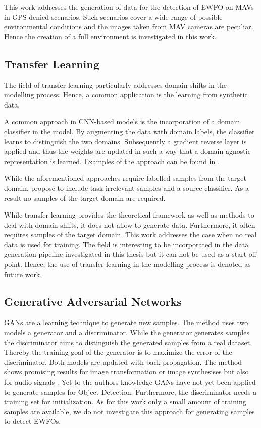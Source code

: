 This work addresses the generation of data for the detection of \ac{EWFO} on \acp{MAV} in \ac{GPS} denied scenarios. Such scenarios cover a wide range of possible environmental conditions and the images taken from \ac{MAV} cameras are peculiar. Hence the creation of a full environment is investigated in this work. 


\subsection{Transfer Learning}

The field of transfer learning particularly addresses domain shifts in the modelling process. Hence, a common application is the learning from synthetic data.

A common approach in \ac{CNN}-based models is the incorporation of a domain classifier in the model. By augmenting the data with domain labels, the classifier learns to distinguish the two domains. Subsequently a gradient reverse layer is applied and thus the weights are updated in such a way that a domain agnostic representation is learned. Examples of the approach can be found in \cite{Chen2018c, Xu2017}.

While the aforementioned approaches require labelled samples from the target domain, \citeauthor{Peng2017} \cite{Peng2017} propose to include task-irrelevant samples and a source classifier. As a result no samples of the target domain are required.

While transfer learning provides the theoretical framework as well as methods to deal with domain shifts, it does not allow to generate data. Furthermore, it often requires samples of the target domain. This work addresses the case when no real data is used for training. The field is interesting to be incorporated in the data generation pipeline investigated in this thesis but it can not be used as a start off point. Hence, the use of transfer learning in the modelling process is denoted as future work.

\subsection{Generative Adversarial Networks}

\acp{GAN} \cite{Goodfellow2014} are a learning technique to generate new samples. The method uses two models a generator and a discriminator. While the generator generates samples the discriminator aims to distinguish the generated samples from a real dataset. Thereby the training goal of the generator is to maximize the error of the discriminator. Both models are updated with back propagation. The method shows promising results for image transformation or image synthesises but also for audio signals \cite{Creswell2017}. Yet to the authors knowledge \acp{GAN} have not yet been applied to generate samples for Object Detection. Furthermore, the discriminator needs a training set for initialization. As for this work only a small amount of training samples are available, we do not investigate this approach for generating samples to detect \acp{EWFO}.

